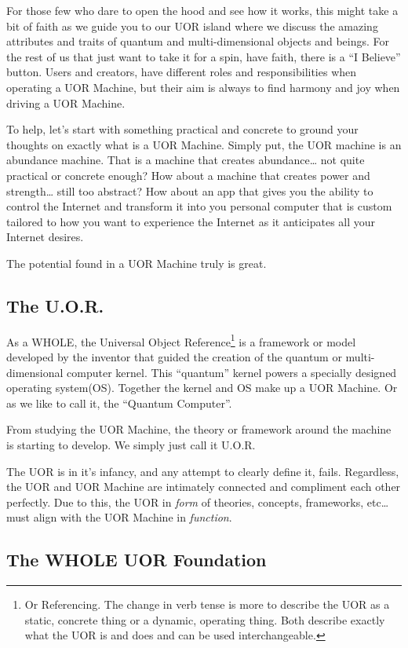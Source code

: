 \documentclass[twocolumn,10pt]{article}
\begin{document}
For those few who dare to open the hood and see how it works, this might take a bit of faith as we guide you to our UOR island where we discuss the amazing attributes and traits of quantum and multi-dimensional objects and beings.
For the rest of us that just want to take it for a spin, have faith, there is a ``I Believe'' button.
Users and creators, have different roles and responsibilities when operating a UOR Machine, but their aim is always to find harmony and joy when driving a UOR Machine.

To help, let's start with something practical and concrete to ground your thoughts on exactly what is a UOR Machine.
Simply put, the UOR machine is an abundance machine.
That is a machine that creates abundance\ldots
not quite practical or concrete enough?
How about a machine that creates power and strength\ldots
still too abstract?
How about an app that gives you the ability to control the Internet and transform it into you personal computer that is custom tailored to how you want to experience the Internet as it anticipates all your Internet desires.

The potential found in a UOR Machine truly is great.

\subsection*{The U.O.R.}
As a WHOLE, the Universal Object Reference\footnote{Or Referencing. The change in verb tense is more to describe the UOR as a static, concrete thing or a dynamic, operating thing. Both describe exactly what the UOR is and does and can be used interchangeable.} is a framework or model developed by the inventor that guided the creation of the quantum or multi-dimensional computer kernel.
This ``quantum'' kernel powers a specially designed operating system(OS).
Together the kernel and OS make up a UOR Machine.
Or as we like to call it, the ``Quantum Computer''.

From studying the UOR Machine, the theory or framework around the machine is starting to develop.
We simply just call it U.O.R.

The UOR is in it's infancy, and any attempt to clearly define it, fails.
Regardless, the UOR and UOR Machine are intimately connected and compliment each other perfectly.
Due to this, the UOR in \textit{form} of theories, concepts, frameworks, etc\ldots must align with the UOR Machine in \textit{function}.
\subsection*{The WHOLE UOR Foundation}
\end{document}
